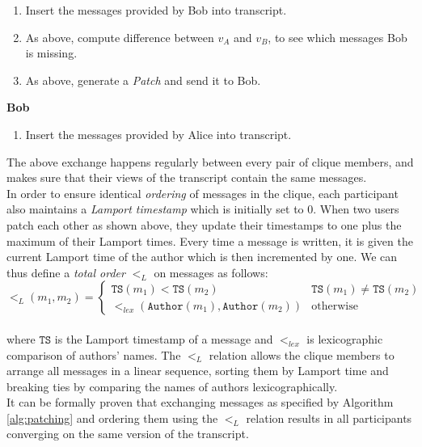 \documentclass[a4paper, 12pt]{report}
\begin{document}
\begin{algorithm}
\begin{enumerate}[topsep=2pt, itemsep=2pt]
    \item Insert the messages provided by Bob into transcript.
    \item As above, compute difference between $v_A$ and $v_B$, to see which messages Bob is missing.
    \item As above, generate a \textit{Patch} and send it to Bob. \\
\end{enumerate}
\vspace{-2pt}
{\bfseries Bob}
\begin{enumerate}[topsep=2pt, itemsep=2pt]
    \item Insert the messages provided by Alice into transcript.
\end{enumerate}
\vspace{2pt}
\end{algorithm}

The above exchange happens regularly between every pair of clique members, and makes sure that their views of the transcript contain the same messages. \\

In order to ensure identical \emph{ordering} of messages in the clique, each participant also maintains a \emph{Lamport timestamp} which is initially set to 0. When two users patch each other as shown above, they update their timestamps to one plus the maximum of their Lamport times. Every time a message is written, it is given the current Lamport time of the author which is then incremented by one. We can thus define a \emph{total order} $<_L$ on messages as follows:\\

\[
    <_L(m_1, m_2) = 
        \begin{cases}
            \mathtt{TS}(m_1) < \mathtt{TS}(m_2) & \mathtt{TS}(m_1) \neq \mathtt{TS}(m_2) \\
            <_{lex}(\mathtt{Author}(m_1), \mathtt{Author}(m_2)) & \text{otherwise}
        \end{cases}
\] \\

where $\mathtt{TS}$ is the Lamport timestamp of a message and $<_{lex}$ is lexicographic comparison of authors' names. The $<_L$ relation allows the clique members to arrange all messages in a linear sequence, sorting them by Lamport time and breaking ties by comparing the names of authors lexicographically. \\ 

It can be formally proven \cite{reardon2007kleeq} that exchanging messages as specified by Algorithm \ref{alg:patching} and ordering them using the $<_L$ relation results in all participants converging on the same version of the transcript.
\end{document}
